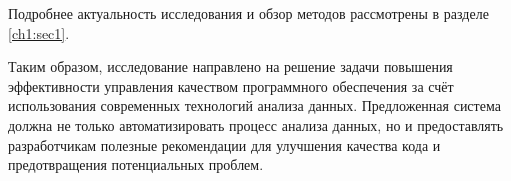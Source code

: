 Подробнее актуальность исследования и обзор методов рассмотрены в разделе \ref{ch1:sec1}.

Таким образом, исследование направлено на решение задачи повышения эффективности управления качеством программного обеспечения за счёт использования современных технологий анализа данных. Предложенная система должна не только автоматизировать процесс анализа данных, но и предоставлять разработчикам полезные рекомендации для улучшения качества кода и предотвращения потенциальных проблем.
